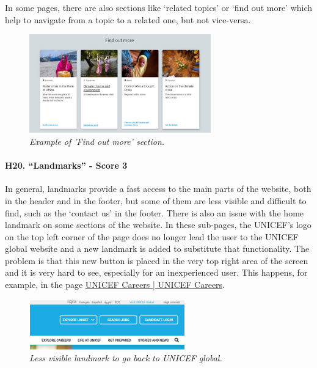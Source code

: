 \newline In some pages, there are also sections like ‘related topics’ or ‘find out more’ which help to navigate from a topic to a related one, but not vice-versa.
\begin{figure}[!h]
	\begin{center}
		\includegraphics[width=0.7\textwidth]{FinalScores22.jpg}
		\captionsetup{font=small}
		\caption{\textit{Example of 'Find out more' section.}}
	\end{center}
\end{figure}
\newline
\newline \paragraph{H20. “Landmarks” - Score 3}	\label{subsec:H20}In general, landmarks provide a fast access to the main parts of the website, both in the header and in the footer, but some of them are less visible and difficult to find, such as the ‘contact us’ in the footer.
\newline There is also an issue with the home landmark on some sections of the website. 
\newline In these sub-pages, the UNICEF's logo on the top left corner of the page does no longer lead the user to the UNICEF global website and a new landmark is added to substitute that functionality. The problem is that this new button is placed in the very top right area of the screen and it is very hard to see, especially for an inexperienced user. This happens, for example, in the page \href{https://www.unicef.org/careers/}{UNICEF Careers | UNICEF Careers}.
\begin{figure}[!h]
	\begin{center}
		\includegraphics[width=0.6\textwidth]{FinalScores23.jpg}
		\captionsetup{font=small}
		\caption{\textit{Less visible landmark to go back to UNICEF global.}}
	\end{center}
\end{figure}
